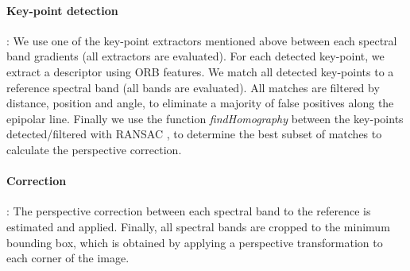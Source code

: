 \documentclass[a4paper,twoside]{article}
\begin{document}
	\paragraph{Key-point detection} : \label{sec:perspective}
	We use one of the key-point extractors mentioned above between each spectral band gradients (all extractors are evaluated).
	For each detected key-point, we extract a descriptor using ORB features.
	We match all detected key-points to a reference spectral band (all bands are evaluated).
	All matches are filtered by distance, position and angle, to eliminate a majority of false positives along the epipolar line.
	Finally we use the function \textit{findHomography} between the key-points detected/filtered with RANSAC \cite{Fischler:1981:RSC:358669.358692},
	to determine the best subset of matches to calculate the perspective correction.
	
	
	\paragraph{Correction} :
	The perspective correction between each spectral band to the reference is estimated and applied.
	Finally, all spectral bands are cropped to the minimum bounding box,
	which is obtained by applying a perspective transformation to each corner of the image.
	
	
\end{document}
